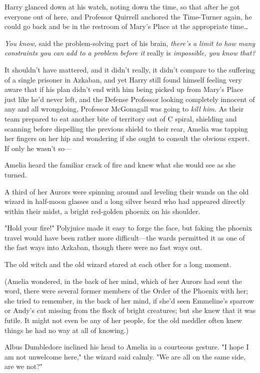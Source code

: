 Harry glanced down at his watch, noting down the time, so that after he got 
everyone out of here, and Professor Quirrell anchored the Time-Turner again, he 
could go back and be in the restroom of Mary's Place at the appropriate 
time{\ldots}

\emph{You know,} said the problem-solving part of his brain, \emph{there's a 
limit to how many constraints you can add to a problem before it} really is 
\emph{impossible, you know that?}

It shouldn't have mattered, and it didn't really, it didn't compare to the 
suffering of a single prisoner in Azkaban, and yet Harry still found himself 
feeling very aware that if his plan didn't end with him being picked up from 
Mary's Place just like he'd never left, and the Defense Professor looking 
completely innocent of any and all wrongdoing, Professor McGonagall was going 
to \emph{kill him.}
\sbreak
As their team prepared to eat another bite of territory out of C spiral, 
shielding and scanning before dispelling the previous shield to their rear, 
Amelia was tapping her fingers on her hip and wondering if she ought to consult 
the obvious expert. If only he wasn't so---

Amelia heard the familiar crack of fire and knew what she would see as she 
turned.

A third of her Aurors were spinning around and leveling their wands on the old 
wizard in half-moon glasses and a long silver beard who had appeared directly 
within their midst, a bright red-golden phoenix on his shoulder.

"Hold your fire!" Polyjuice made it easy to forge the face, but faking the 
phoenix travel would have been rather more difficult---the wards permitted it 
as one of the fast ways into Azkaban, though there were no fast ways out.

The old witch and the old wizard stared at each other for a long moment.

(Amelia wondered, in the back of her mind, which of her Aurors had sent the 
word, there were several former members of the Order of the Phoenix with her; 
she tried to remember, in the back of her mind, if she'd seen Emmeline's 
sparrow or Andy's cat missing from the flock of bright creatures; but she knew 
that it was futile. It might not even be any of her people, for the old meddler 
often knew things he had no way at all of knowing.)

Albus Dumbledore inclined his head to Amelia in a courteous gesture. "I hope I 
am not unwelcome here," the wizard said calmly. "We are all on the same side, 
are we not?"

